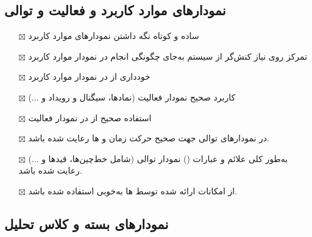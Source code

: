 \subsection{نمودارهای موارد کاربرد و فعالیت و توالی}

\begin{itemize} \setlength\itemsep{0cm}
	\item[$\boxtimes$]
	ساده و کوتاه نگه داشتن نمودارهای موارد کاربرد
	\item[$\boxtimes$]
	تمرکز روی نیاز کنش‌گر از سیستم به‌جای چگونگی انجام در نمودار موارد کاربرد
	\item[$\boxtimes$]
	خودداری از  در نمودار موارد کاربرد
	\item[$\boxtimes$]
	کاربرد صحیح  نمودار فعالیت (نمادها، سیگنال و رویداد و ...)
	\item[$\boxtimes$]
	استفاده صحیح از  در نمودار فعالیت
	\item[$\boxtimes$]
	در نمودارهای توالی جهت صحیح حرکت زمان و ها رعایت شده باشد.
	\item[$\boxtimes$]
	به‌طور کلی علائم و عبارات () نمودار توالی (شامل خط‌چین‌ها، قیدها و ...) رعایت شده باشد.
	\item[$\boxtimes$]
	از امکانات ارائه شده توسط ها به‌خوبی استفاده شده باشد.
	
\end{itemize}

\subsection{نمودارهای بسته و کلاس تحلیل}


